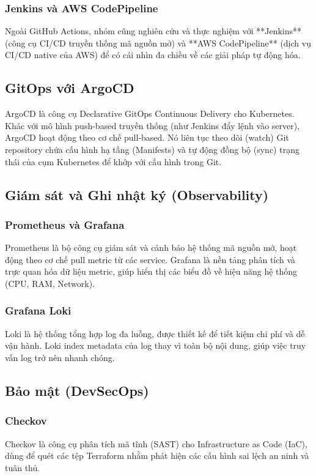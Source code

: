 \documentclass[12pt, a4paper]{article}
\begin{document}
\subsubsection{Jenkins và AWS CodePipeline}
Ngoài GitHub Actions, nhóm cũng nghiên cứu và thực nghiệm với **Jenkins** (công cụ CI/CD truyền thống mã nguồn mở) và **AWS CodePipeline** (dịch vụ CI/CD native của AWS) để có cái nhìn đa chiều về các giải pháp tự động hóa.

\subsection{GitOps với ArgoCD}
ArgoCD là công cụ Declarative GitOps Continuous Delivery cho Kubernetes. Khác với mô hình push-based truyền thống (như Jenkins đẩy lệnh vào server), ArgoCD hoạt động theo cơ chế pull-based. Nó liên tục theo dõi (watch) Git repository chứa cấu hình hạ tầng (Manifests) và tự động đồng bộ (sync) trạng thái của cụm Kubernetes để khớp với cấu hình trong Git.

\subsection{Giám sát và Ghi nhật ký (Observability)}
\subsubsection{Prometheus và Grafana}
Prometheus là bộ công cụ giám sát và cảnh báo hệ thống mã nguồn mở, hoạt động theo cơ chế pull metric từ các service. Grafana là nền tảng phân tích và trực quan hóa dữ liệu metric, giúp hiển thị các biểu đồ về hiệu năng hệ thống (CPU, RAM, Network).

\subsubsection{Grafana Loki}
Loki là hệ thống tổng hợp log đa luồng, được thiết kế để tiết kiệm chi phí và dễ vận hành. Loki index metadata của log thay vì toàn bộ nội dung, giúp việc truy vấn log trở nên nhanh chóng.

\subsection{Bảo mật (DevSecOps)}
\subsubsection{Checkov}
Checkov là công cụ phân tích mã tĩnh (SAST) cho Infrastructure as Code (IaC), dùng để quét các tệp Terraform nhằm phát hiện các cấu hình sai lệch an ninh và tuân thủ.
\end{document}
